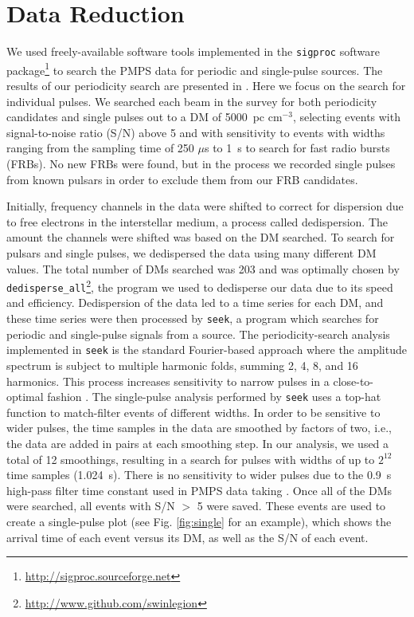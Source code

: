 \documentclass[fleqn,usenatbib]{mnras}
\begin{document}
\section{Data Reduction}
\label{data}

We used freely-available software tools implemented in the {\tt sigproc} software 
package\footnote{\url{http://sigproc.sourceforge.net}} to search the PMPS data for periodic and single-pulse sources. The results of our periodicity search are presented in \cite{Mickaliger:2012}. Here we focus on the search for individual pulses. We searched each beam in the survey for both periodicity candidates and single pulses out to a DM of 5000~pc cm$^{-3}$, selecting events with signal-to-noise ratio (S/N) above 5 and with 
sensitivity to events with widths ranging from the sampling time of 250 $\mu$s to 1~s to search for fast radio bursts (FRBs). No new FRBs were found, but in the process we recorded single pulses from known pulsars in order to exclude them from our FRB candidates.

Initially, frequency channels in the data were shifted to correct for dispersion due to free
electrons in the interstellar medium, a process called dedispersion. The amount the channels
were shifted was based on the DM searched. To search for pulsars and single pulses, we dedispersed
the data using many different DM values. The total number of DMs searched was 203 and was
optimally chosen by {\tt dedisperse\_all}\footnote{\url{http://www.github.com/swinlegion}}, the
program we used to dedisperse our data due to its speed and efficiency. Dedispersion of the data
led to a time series for each DM, and these time series were then processed by {\tt seek}, a
program which searches for periodic and single-pulse signals from a source. The periodicity-search
analysis implemented in {\tt seek} is the standard Fourier-based approach where the amplitude
spectrum is subject to multiple harmonic folds, summing 2, 4, 8, and 16 harmonics. This process increases sensitivity to narrow pulses in a close-to-optimal fashion \citep{Ransom:2002}. The single-pulse analysis performed by {\tt seek} uses a top-hat function to match-filter events of different widths. In order to be sensitive to wider pulses, the time samples in the data are smoothed by factors of two, i.e., the data are added in pairs at each smoothing step. In our analysis, we used a total of 12 smoothings, resulting in a search for pulses with widths of up to $2^{12}$ time samples (1.024~s). There is no sensitivity to wider pulses due to the 0.9~s high-pass filter time constant used 
in PMPS data taking \citep{Manchester:2001}. Once all of the DMs were searched, all events with S/N $>$ 5 were saved. These events are used to create a single-pulse plot (see Fig. \ref{fig:single} for an example), which shows the arrival time of each event versus its DM, as well as the S/N of each event.
\end{document}
